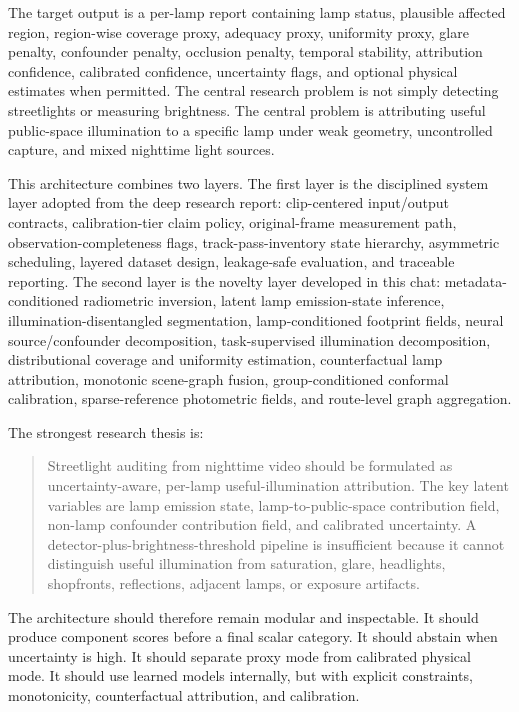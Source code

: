 \documentclass[11pt]{article}
\begin{document}
The target output is a per-lamp report containing lamp status, plausible affected region, region-wise coverage proxy, adequacy proxy, uniformity proxy, glare penalty, confounder penalty, occlusion penalty, temporal stability, attribution confidence, calibrated confidence, uncertainty flags, and optional physical estimates when permitted. The central research problem is not simply detecting streetlights or measuring brightness. The central problem is attributing useful public-space illumination to a specific lamp under weak geometry, uncontrolled capture, and mixed nighttime light sources.

This architecture combines two layers. The first layer is the disciplined system layer adopted from the deep research report: clip-centered input/output contracts, calibration-tier claim policy, original-frame measurement path, observation-completeness flags, track-pass-inventory state hierarchy, asymmetric scheduling, layered dataset design, leakage-safe evaluation, and traceable reporting. The second layer is the novelty layer developed in this chat: metadata-conditioned radiometric inversion, latent lamp emission-state inference, illumination-disentangled segmentation, lamp-conditioned footprint fields, neural source/confounder decomposition, task-supervised illumination decomposition, distributional coverage and uniformity estimation, counterfactual lamp attribution, monotonic scene-graph fusion, group-conditioned conformal calibration, sparse-reference photometric fields, and route-level graph aggregation.

The strongest research thesis is:
\begin{quote}
Streetlight auditing from nighttime video should be formulated as uncertainty-aware, per-lamp useful-illumination attribution. The key latent variables are lamp emission state, lamp-to-public-space contribution field, non-lamp confounder contribution field, and calibrated uncertainty. A detector-plus-brightness-threshold pipeline is insufficient because it cannot distinguish useful illumination from saturation, glare, headlights, shopfronts, reflections, adjacent lamps, or exposure artifacts.
\end{quote}

The architecture should therefore remain modular and inspectable. It should produce component scores before a final scalar category. It should abstain when uncertainty is high. It should separate proxy mode from calibrated physical mode. It should use learned models internally, but with explicit constraints, monotonicity, counterfactual attribution, and calibration.
\end{document}

